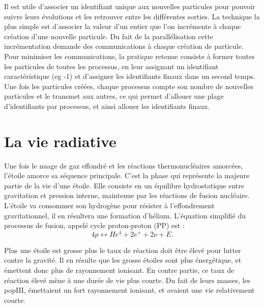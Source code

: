 Il est utile d'associer un identifiant unique aux nouvelles particules pour pouvoir suivre leurs évolutions et les retrouver entre les différentes sorties.
La technique la plus simple est d'associer la valeur d'un entier que l'on incrémente à chaque création d'une nouvelle particule.
Du fait de la parallélisation cette incrémentation demande des communications à chaque création de particule.
Pour minimiser les communications, la pratique retenue consiste à former toutes les particules de toutes les processus, en leur assignant un identifiant caractéristique (eg -1) et d'assigner les identifiants finaux dans un second temps.
Une fois les particules créées, chaque processus compte son nombre de nouvelles particules et le transmet aux autres, ce qui permet d'allouer une plage d'identifiants par processus, et ainsi allouer les identifiants finaux.




\section{La vie radiative}
\label{sec:etoilerad}


Une fois le nuage de gaz effondré et les réactions thermonucléaires amorcées, l'étoile amorce sa séquence principale.
C'est la phase qui représente la majeure partie de la vie d'une étoile.
Elle consiste en un équilibre hydrostatique entre gravitation et pression interne, maintenue par les réactions de fusion nucléaire.
L'étoile va consommer son hydrogène pour résister à l'effondrement gravitationnel, il en résultera une formation d'hélium.
L'équation simplifié du processus de fusion, appelé cycle proton-proton (PP) est :
\begin{equation}
4p \leftrightarrow He^4 + 2e^+ + 2\nu + E.
\end{equation}

Plus une étoile est grosse plus le taux de réaction doit être élevé pour lutter contre la gravité.
Il en résulte que les grosse étoiles sont plus énergétique, et émettent donc plus de rayonnement ionisant.
En contre partie, ce taux de réaction élevé mène à une durée de vie plus courte.
Du fait de leurs masses, les popIII, émettaient un fort rayonnement ionisant, et avaient une vie relativement courte.

